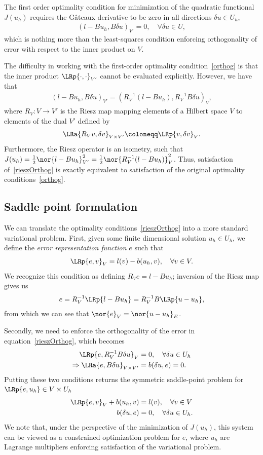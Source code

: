 The first order optimality condition for minimization of the quadratic functional $J(u_h)$ requires the G\^ateaux derivative to be zero in all directions $\delta u \in U_h$,
\begin{align}
\left(l-Bu_h,B\delta u\right)_{V'} = 0, \quad \forall \delta u \in U,
\label{orthog}
\end{align}
which is nothing more than the least-squares condition enforcing orthogonality of error with respect to the inner product on $V$.  

The difficulty in working with the first-order optimality condition~\eqref{orthog} is that the inner product $\LRp{\cdot,\cdot}_{V'}$ cannot be evaluated explicitly.  However, we have that 
\begin{align}
\left(l-Bu_h,B\delta u\right)_{V'} = \left(R_V^{-1}(l-Bu_h),R_V^{-1}B\delta u\right)_{V},
\label{rieszOrthog}
\end{align}
where $R_V: V\rightarrow V'$ is the Riesz map mapping elements of a Hilbert space $V$ to elements of the dual $V'$ defined by
\[
\LRa{R_Vv,\delta v}_{V\times V'} \coloneqq \LRp{v,\delta v}_V.
\]
Furthermore, the Riesz operator is an isometry, such that $J(u_h) = \frac{1}{2}\nor{l-Bu_h}^2_{V'} = \frac{1}{2}\nor{R_V^{-1}(l-Bu_h)}^2_{V}$.  Thus, satisfaction of~\eqref{rieszOrthog} is exactly equivalent to satisfaction of the original optimality conditions~\eqref{orthog}.  

\subsection{Saddle point formulation}
\label{sec:saddlePoint}
We can translate the optimality conditions~\eqref{rieszOrthog} into a more standard variational problem.  First, given some finite dimensional solution $u_h\in U_h$, we define the \textit{error representation function} $e$ such that
\[
\LRp{e,v}_V = l(v)-b(u_h,v), \quad \forall v\in V.
\]
We recognize this condition as defining $R_V e = l-Bu_h$; inversion of the Riesz map gives us 
\[
e = R_V^{-1}\LRp{l-Bu_h} = R_V^{-1}B\LRp{u-u_h},
\]
from which we can see that $\nor{e}_V = \nor{u-u_h}_E$.  

Secondly, we need to enforce the orthogonality of the error in equation~\eqref{rieszOrthog}, which becomes
\begin{align*}
\LRp{e,R_V^{-1}B\delta u}_V &= 0, \quad \forall \delta u \in U_h\\
\Rightarrow \LRa{e,B\delta u}_{V\times V'} &= b(\delta u, e) = 0.
\end{align*}
Putting these two conditions returns the symmetric saddle-point problem for $\LRp{e,u_h} \in V\times U_h$
\begin{align*}
\LRp{e,v}_V + b(u_h,v) &= l(v), \quad \forall v\in V\\
b(\delta u, e) &= 0, \quad \forall \delta u \in U_h.
\end{align*}
We note that, under the perspective of the minimization of $J(u_h)$, this system can be viewed as a constrained optimization problem for $e$, where $u_h$ are Lagrange multipliers enforcing satisfaction of the variational problem.  

